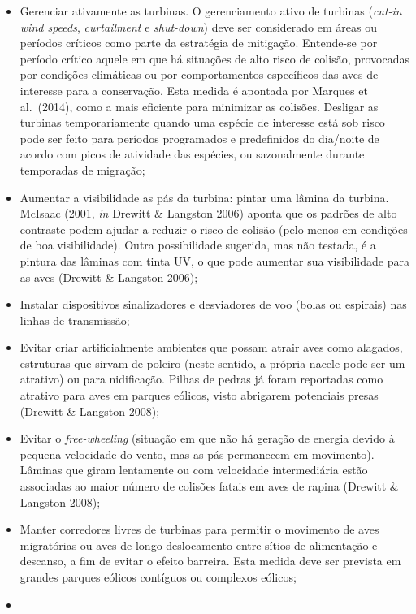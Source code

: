 \documentclass[
  oneside]{scrbook}
\providecommand{\tightlist}{%
  \setlength{\itemsep}{0pt}\setlength{\parskip}{0pt}}
\begin{document}
\begin{itemize}
\tightlist
\item
  Gerenciar ativamente as turbinas. O gerenciamento ativo de turbinas (\emph{cut-in wind speeds}, \emph{curtailment} e \emph{shut-down}) deve ser considerado em áreas ou períodos críticos como parte da estratégia de mitigação. Entende-se por período crítico aquele em que há situações de alto risco de colisão, provocadas por condições climáticas ou por comportamentos específicos das aves de interesse para a conservação. Esta medida é apontada por Marques et al.~(2014), como a mais eficiente para minimizar as colisões. Desligar as turbinas temporariamente quando uma espécie de interesse está sob risco pode ser feito para períodos programados e predefinidos do dia/noite de acordo com picos de atividade das espécies, ou sazonalmente durante temporadas de migração;
\item
  Aumentar a visibilidade as pás da turbina: pintar uma lâmina da turbina. McIsaac (2001, \emph{in} Drewitt \& Langston 2006) aponta que os padrões de alto contraste podem ajudar a reduzir o risco de colisão (pelo menos em condições de boa visibilidade). Outra possibilidade sugerida, mas não testada, é a pintura das lâminas com tinta UV, o que pode aumentar sua visibilidade para as aves (Drewitt \& Langston 2006);
\item
  Instalar dispositivos sinalizadores e desviadores de voo (bolas ou espirais) nas linhas de transmissão;
\item
  Evitar criar artificialmente ambientes que possam atrair aves como alagados, estruturas que sirvam de poleiro (neste sentido, a própria nacele pode ser um atrativo) ou para nidificação. Pilhas de pedras já foram reportadas como atrativo para aves em parques eólicos, visto abrigarem potenciais presas (Drewitt \& Langston 2008);
\item
  Evitar o \emph{free-wheeling} (situação em que não há geração de energia devido à pequena velocidade do vento, mas as pás permanecem em movimento). Lâminas que giram lentamente ou com velocidade intermediária estão associadas ao maior número de colisões fatais em aves de rapina (Drewitt \& Langston 2008);
\item
  Manter corredores livres de turbinas para permitir o movimento de aves migratórias ou aves de longo deslocamento entre sítios de alimentação e descanso, a fim de evitar o efeito barreira. Esta medida deve ser prevista em grandes parques eólicos contíguos ou complexos eólicos;
\item

\end{itemize}
\end{document}
